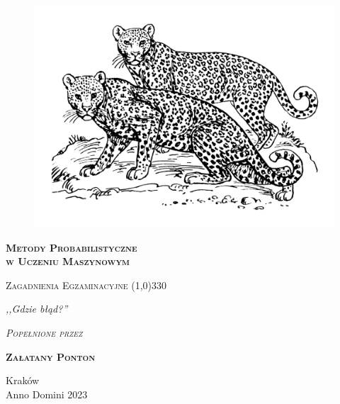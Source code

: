 \begin{titlepage} 
    \begin{center}
         \begin{figure}[h]
            \centering
            \includegraphics[]{img/pumy.png}
           
        \end{figure}
        
        \Huge
        \textbf{\textsc{Metody Probabilistyczne \\ w Uczeniu Maszynowym}}
        
        \vspace{0.5cm}
        \Large
        \textsc{Zagadnienia Egzaminacyjne}
        \line(1,0){330}
        
        \normalsize
        
        \vspace{1cm}
        \textit{,,Gdzie błąd?''}
        \vspace{1cm}

        \textit{\textsc{Popełnione przez}}\\
        \vspace{5mm}
  
        \textbf{\textsc{Załatany Ponton}}
 
        \vfill

        Kraków \\
        Anno Domini 2023
    \end{center}
\end{titlepage}